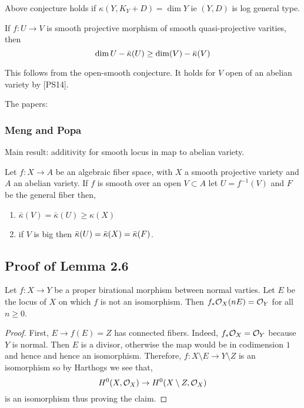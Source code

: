 \documentclass[12pt]{article}
\begin{document}
\begin{theorem}
Above conjecture holds if $\kappa(Y, K_Y + D) = \dim{Y}$ ie $(Y, D)$ is log general type.
\end{theorem}

\begin{conj}
If $f : U \to V$ is smooth projective morphism of smooth quasi-projective varities, then
\[ \dim{U} - \bar{\kappa}(U) \ge \dim(V) - \bar{\kappa}(V) \]
\end{conj}

\begin{rmk}
This follows from the open-smooth conjecture. It holds for $V$ open of an abelian variety by [PS14].
\end{rmk}

The papers:

\subsubsection{Meng and Popa}

Main result: additivity for smooth locus in map to abelian variety.

\begin{theorem}
Let $f : X \to A$ be an algebraic fiber space, with $X$ a smooth projective variety and $A$ an abelian variety. If $f$ is smooth over an open $V \subset A$ let $U = f^{-1}(V)$  and $F$ be the general fiber then,
\begin{enumerate}
\item $\bar{\kappa}(V) = \bar{\kappa}(U) \ge \kappa(X)$
\item if $V$ is big then $\bar{\kappa}(U) = \bar{\kappa}(X) = \bar{\kappa}(F)$. 
\end{enumerate}
\end{theorem}

\subsection{Proof of Lemma 2.6}

\begin{lemma}
Let $f : X \to Y$ be a proper birational morphism between normal varties. Let $E$ be the locus of $X$ on which $f$ is not an isomorphism. Then $f_* \mathcal{O}_{X}(n E) = \mathcal{O}_{Y}$ for all $n \ge 0$. 
\end{lemma}

\begin{proof}
First, $E \to f(E) = Z$ has connected fibers. Indeed, $f_* \mathcal{O}_{X} = \mathcal{O}_{Y}$ because $Y$ is normal. Then $E$ is a divisor, otherwise the map would be \etale in codimension $1$ and hence \etale and hence an isomorphism. Therefore, $f : X \setminus E \to Y \setminus Z$ is an isomorphism so by Harthogs we see that,
\[ H^0(X, \mathcal{O}_{X}) \to H^0(X \setminus Z, \mathcal{O}_{X}) \]
is an isomorphism thus proving the claim.
\end{proof}
\end{document}
